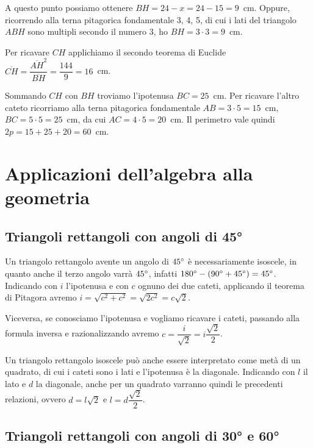 \begin{exrig}
\begin{esempio}
A questo punto possiamo ottenere $BH = 24-x = 24-15 = 9$~cm. Oppure, ricorrendo alla terna pitagorica fondamentale 3, 4, 5, di cui i lati del triangolo $ABH$ sono multipli secondo il numero 3, ho $BH = 3 \cdot 3 = 9$~cm.

Per ricavare $CH$ applichiamo il secondo teorema di Euclide $\overline{CH}=\dfrac{\overline{AH}^2}{\overline{BH}}=\dfrac{144}{9}=16$~cm.

Sommando $CH$ con $BH$ troviamo l'ipotenusa $BC=25$~cm. Per ricavare l'altro cateto ricorriamo alla terna pitagorica fondamentale $AB=3\cdot 5=15$~cm, $BC=5\cdot 5=25$~cm, da cui $AC=4\cdot 5=20$~cm.
Il perimetro vale quindi $2p=15+25+20=60$~cm.
\end{esempio}
\end{exrig}

\section{Applicazioni dell'algebra alla geometria}\label{sect:applicazioni_algebra}

\subsection{Triangoli rettangoli con angoli di 45°}

\begin{wrapfigure}{r}{0.25\textwidth}
	\centering
\end{wrapfigure}
Un triangolo rettangolo avente un angolo di $45{}^{\circ}$ è necessariamente isoscele, in quanto anche il terzo angolo varrà $45{}^{\circ}$, infatti $180{}^{\circ} - (90{}^{\circ}+45{}^{\circ})=45{}^{\circ}$.
Indicando con $i$ l'ipotenusa e con $c$ ognuno dei due cateti, applicando il teorema di Pitagora avremo $i=\sqrt{c^2+c^2}=\sqrt{2c^2}=c\sqrt{2}$.

Viceversa, se conosciamo l'ipotenusa e vogliamo ricavare i cateti, passando alla formula inversa e razionalizzando avremo $c=\dfrac{i}{\sqrt{2}}=i\dfrac{\sqrt{2}}{2}$.

Un triangolo rettangolo isoscele può anche essere interpretato come metà di un quadrato, di cui i cateti sono i lati e l'ipotenusa è la diagonale.
Indicando con $l$ il lato e $d$ la diagonale, anche per un quadrato varranno quindi le precedenti relazioni, ovvero $d=l\sqrt{2}$ e $l=d\dfrac{\sqrt{2}}{2}$.

\subsection{Triangoli rettangoli con angoli di 30° e 60°}

